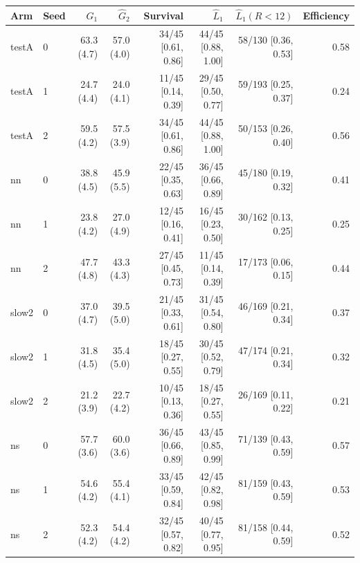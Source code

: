 \begin{tabular}{llrrrrrr}
\toprule
Arm & Seed & $\hat G_1$ & $\hat G_2$ & Survival & $\hat L_1$ & $\hat L_1(R<12)$ & Efficiency \\
\midrule
testA & 0 & 63.3 (4.7) & 57.0 (4.0) & 34/45 [0.61, 0.86] & 44/45 [0.88, 1.00] & 58/130 [0.36, 0.53] & 0.58 \\
testA & 1 & 24.7 (4.4) & 24.0 (4.1) & 11/45 [0.14, 0.39] & 29/45 [0.50, 0.77] & 59/193 [0.25, 0.37] & 0.24 \\
testA & 2 & 59.5 (4.2) & 57.5 (3.9) & 34/45 [0.61, 0.86] & 44/45 [0.88, 1.00] & 50/153 [0.26, 0.40] & 0.56 \\
nn & 0 & 38.8 (4.5) & 45.9 (5.5) & 22/45 [0.35, 0.63] & 36/45 [0.66, 0.89] & 45/180 [0.19, 0.32] & 0.41 \\
nn & 1 & 23.8 (4.2) & 27.0 (4.9) & 12/45 [0.16, 0.41] & 16/45 [0.23, 0.50] & 30/162 [0.13, 0.25] & 0.25 \\
nn & 2 & 47.7 (4.8) & 43.3 (4.3) & 27/45 [0.45, 0.73] & 11/45 [0.14, 0.39] & 17/173 [0.06, 0.15] & 0.44 \\
slow2 & 0 & 37.0 (4.7) & 39.5 (5.0) & 21/45 [0.33, 0.61] & 31/45 [0.54, 0.80] & 46/169 [0.21, 0.34] & 0.37 \\
slow2 & 1 & 31.8 (4.5) & 35.4 (5.0) & 18/45 [0.27, 0.55] & 30/45 [0.52, 0.79] & 47/174 [0.21, 0.34] & 0.32 \\
slow2 & 2 & 21.2 (3.9) & 22.7 (4.2) & 10/45 [0.13, 0.36] & 18/45 [0.27, 0.55] & 26/169 [0.11, 0.22] & 0.21 \\
ns & 0 & 57.7 (3.6) & 60.0 (3.6) & 36/45 [0.66, 0.89] & 43/45 [0.85, 0.99] & 71/139 [0.43, 0.59] & 0.57 \\
ns & 1 & 54.6 (4.2) & 55.4 (4.1) & 33/45 [0.59, 0.84] & 42/45 [0.82, 0.98] & 81/159 [0.43, 0.59] & 0.53 \\
ns & 2 & 52.3 (4.2) & 54.4 (4.2) & 32/45 [0.57, 0.82] & 40/45 [0.77, 0.95] & 81/158 [0.44, 0.59] & 0.52 \\
\bottomrule
\end{tabular}
